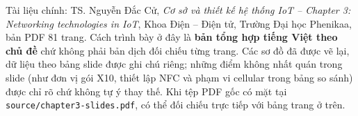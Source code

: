\begin{nguonslide}[title={Nguồn và phương pháp biên soạn}]
Tài liệu chính: TS. Nguyễn Đắc Cử, \textit{Cơ sở và thiết kế hệ thống IoT -- Chapter 3: Networking technologies in IoT}, Khoa Điện -- Điện tử, Trường Đại học Phenikaa, bản PDF 81 trang. Cách trình bày ở đây là \textbf{bản tổng hợp tiếng Việt theo chủ đề} chứ không phải bản dịch đối chiếu từng trang. Các sơ đồ đã được vẽ lại, dữ liệu theo bảng slide được ghi chú riêng; những điểm không nhất quán trong slide (như đơn vị gói X10, thiết lập NFC và phạm vi cellular trong bảng so sánh) được chỉ rõ chứ không tự ý thay thế. Khi tệp PDF gốc có mặt tại \texttt{source/chapter3-slides.pdf}, có thể đối chiếu trực tiếp với bảng trang ở trên.
\end{nguonslide}
